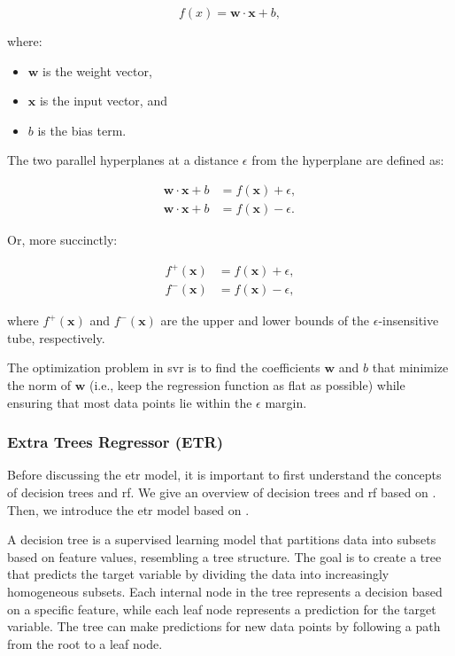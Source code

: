 $$
f(x) = \mathbf{w} \cdot \mathbf{x} + b,
$$

where:

\begin{itemize}
	\item $\mathbf{w}$ is the weight vector,
	\item $\mathbf{x}$ is the input vector, and
	\item $b$ is the bias term.
\end{itemize}

The two parallel hyperplanes at a distance $\epsilon$ from the hyperplane are defined as:

$$
\begin{aligned}
    \mathbf{w} \cdot \mathbf{x} + b &= f(\mathbf{x}) + \epsilon, \\
    \mathbf{w} \cdot \mathbf{x} + b &= f(\mathbf{x}) - \epsilon.
\end{aligned}
$$

Or, more succinctly:

$$
\begin{aligned}
    f^+(\mathbf{x}) &= f(\mathbf{x}) + \epsilon, \\
    f^-(\mathbf{x}) &= f(\mathbf{x}) - \epsilon,
\end{aligned}
$$

where $f^+(\mathbf{x})$ and $f^-(\mathbf{x})$ are the upper and lower bounds of the $\epsilon$-insensitive tube, respectively.

The optimization problem in \gls{svr} is to find the coefficients $\mathbf{w}$ and $b$ that minimize the norm of $\mathbf{w}$ (i.e., keep the regression function as flat as possible) while ensuring that most data points lie within the $\epsilon$ margin.

\subsubsection{Extra Trees Regressor (ETR)}
Before discussing the \gls{etr} model, it is important to first understand the concepts of decision trees and \gls{rf}.
We give an overview of decision trees and \gls{rf} based on \citet{James2023AnIS}.
Then, we introduce the \gls{etr} model based on \citet{geurtsERF}.

A decision tree is a supervised learning model that partitions data into subsets based on feature values, resembling a tree structure.
The goal is to create a tree that predicts the target variable by dividing the data into increasingly homogeneous subsets.
Each internal node in the tree represents a decision based on a specific feature, while each leaf node represents a prediction for the target variable.
The tree can make predictions for new data points by following a path from the root to a leaf node.

